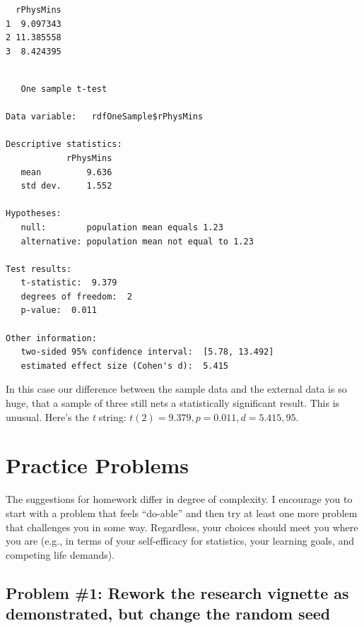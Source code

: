 \documentclass[
  11pt,
]{book}
\newenvironment{Shaded}{\begin{snugshade}}{\end{snugshade}}
\newcommand{\AttributeTok}[1]{\textcolor[rgb]{0.77,0.63,0.00}{#1}}
\newcommand{\FloatTok}[1]{\textcolor[rgb]{0.00,0.00,0.81}{#1}}
\newcommand{\FunctionTok}[1]{\textcolor[rgb]{0.00,0.00,0.00}{#1}}
\newcommand{\NormalTok}[1]{#1}
\newcommand{\SpecialCharTok}[1]{\textcolor[rgb]{0.00,0.00,0.00}{#1}}
\begin{document}
\begin{verbatim}
  rPhysMins
1  9.097343
2 11.385558
3  8.424395
\end{verbatim}

\begin{Shaded}
\end{Shaded}

\begin{verbatim}

   One sample t-test 

Data variable:   rdfOneSample$rPhysMins 

Descriptive statistics: 
            rPhysMins
   mean         9.636
   std dev.     1.552

Hypotheses: 
   null:        population mean equals 1.23 
   alternative: population mean not equal to 1.23 

Test results: 
   t-statistic:  9.379 
   degrees of freedom:  2 
   p-value:  0.011 

Other information: 
   two-sided 95% confidence interval:  [5.78, 13.492] 
   estimated effect size (Cohen's d):  5.415 
\end{verbatim}

In this case our difference between the sample data and the external data is so huge, that a sample of three still nets a statistically significant result. This is unusual. Here's the \emph{t} string: \(t(2) = 9.379, p = 0.011, d = 5.415, 95%
\).

\hypertarget{practice-problems-2}{%
\section{Practice Problems}\label{practice-problems-2}}

The suggestions for homework differ in degree of complexity. I encourage you to start with a problem that feels ``do-able'' and then try at least one more problem that challenges you in some way. Regardless, your choices should meet you where you are (e.g., in terms of your self-efficacy for statistics, your learning goals, and competing life demands).

\hypertarget{problem-1-rework-the-research-vignette-as-demonstrated-but-change-the-random-seed}{%
\subsection{Problem \#1: Rework the research vignette as demonstrated, but change the random seed}\label{problem-1-rework-the-research-vignette-as-demonstrated-but-change-the-random-seed}}
\end{document}
